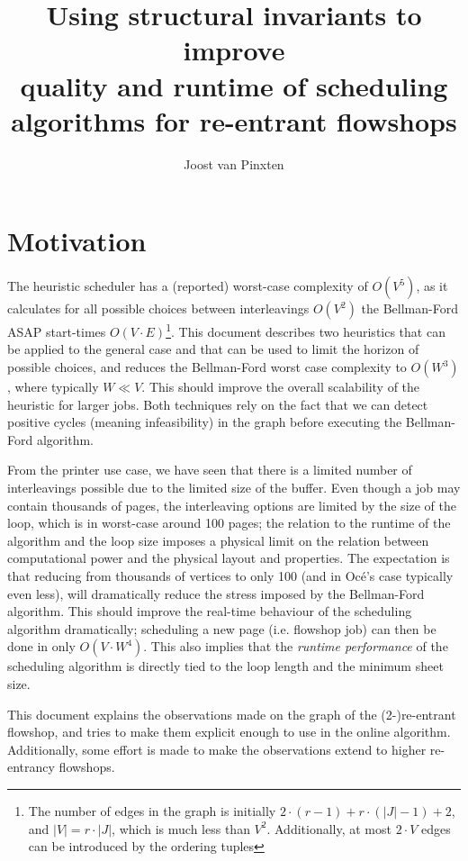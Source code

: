 \documentclass[]{article}
\title{Using structural invariants to improve\\quality and runtime of scheduling algorithms for re-entrant flowshops}
\author{Joost van Pinxten}
\begin{document}
\maketitle

\section{Motivation}

The heuristic scheduler has a (reported) worst-case complexity of $O(V^5)$, as it calculates for all possible choices between interleavings $O(V^2)$ the Bellman-Ford ASAP start-times $O(V\cdot E)$\footnote{The number of edges in the graph is initially $2\cdot (r-1) + r \cdot (|J| - 1) + 2$, and $|V|=r\cdot |J|$, which is much less than $V^2$. Additionally, at most $2\cdot V$ edges can be introduced by the ordering tuples}. This document describes two heuristics that can be applied to the general case and that can be used to limit the horizon of possible choices, and reduces the Bellman-Ford worst case complexity to $O(W^3)$, where typically $W \ll V$. This should improve the overall scalability of the heuristic for larger jobs. Both techniques rely on the fact that we can detect positive cycles (meaning infeasibility) in the graph before executing the Bellman-Ford algorithm.

From the printer use case, we have seen that there is a limited number of interleavings possible due to the limited size of the buffer. Even though a job may contain thousands of pages, the interleaving options are limited by the size of the loop, which is in worst-case around 100 pages; the relation to the runtime of the algorithm and the loop size imposes a physical limit on the relation between computational power and the physical layout and properties. The expectation is that reducing from thousands of vertices to only 100 (and in Oc\'e's case typically even less), will dramatically reduce the stress imposed by the Bellman-Ford algorithm. This should improve the real-time behaviour of the scheduling algorithm dramatically; scheduling a new page (i.e. flowshop job) can then be done in only $O(V \cdot W^4)$. This also implies that the \textit{runtime performance} of the scheduling algorithm is directly tied to the loop length and the minimum sheet size.

This document explains the observations made on the graph of the (2-)re-entrant flowshop, and tries to make them explicit enough to use in the online algorithm. Additionally, some effort is made to make the observations extend to higher re-entrancy flowshops.
\end{document}
